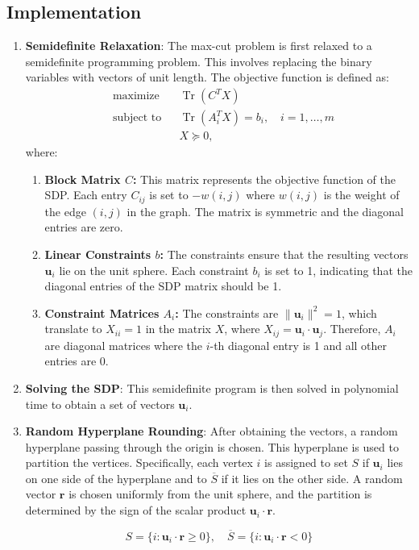 \subsection{Implementation}

\begin{enumerate}
        \item \textbf{Semidefinite Relaxation}: The max-cut problem is first relaxed to a semidefinite programming problem. This involves replacing the binary variables with vectors of unit length. The objective function is defined as:
        \[
        \begin{aligned}
        & \text{maximize} && \operatorname{Tr}(C^T X) \\
        & \text{subject to} && \operatorname{Tr}(A_i^T X) = b_i, \quad i = 1, \ldots, m \\
        & && X \succeq 0,
        \end{aligned}
        \]
        where:
        \begin{enumerate}
            \item \textbf{Block Matrix \( C \):} This matrix represents the objective function of the SDP. Each entry \( C_{ij} \) is set to \(-w(i, j)\) where \( w(i, j) \) is the weight of the edge \((i, j)\) in the graph. The matrix is symmetric and the diagonal entries are zero.
            \item \textbf{Linear Constraints \( b \):} The constraints ensure that the resulting vectors \( \mathbf{u}_i \) lie on the unit sphere. Each constraint \( b_i \) is set to 1, indicating that the diagonal entries of the SDP matrix should be 1.
            \item \textbf{Constraint Matrices \(A_i\):} The constraints are \(\|\mathbf{u}_i\|^2 = 1\), which translate to \(X_{ii} = 1\) in the matrix \(X\), where \(X_{ij} = \mathbf{u}_i \cdot \mathbf{u}_j\). Therefore, \(A_i\) are diagonal matrices where the \(i\)-th diagonal entry is 1 and all other entries are 0.
        \end{enumerate}

        \item \textbf{Solving the SDP}: This semidefinite program is then solved in polynomial time to obtain a set of vectors \(\mathbf{u}_i\).

        \item \textbf{Random Hyperplane Rounding}: After obtaining the vectors, a random hyperplane passing through the origin is chosen. This hyperplane is used to partition the vertices. Specifically, each vertex \(i\) is assigned to set \(S\) if \(\mathbf{u}_i\) lies on one side of the hyperplane and to \(\overline{S}\) if it lies on the other side. A random vector \(\mathbf{r}\) is chosen uniformly from the unit sphere, and the partition is determined by the sign of the scalar product \(\mathbf{u}_i \cdot \mathbf{r}\). 
        
        \[
        S = \{i \colon \mathbf{u}_i \cdot \mathbf{r} \geq 0\}, \quad \overline{S} = \{i \colon \mathbf{u}_i \cdot \mathbf{r} < 0\}
        \]
    \end{enumerate}


